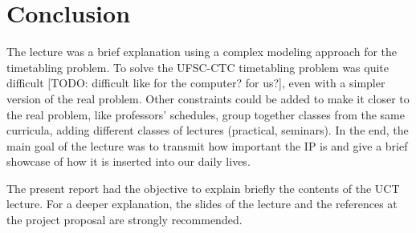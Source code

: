 \section{Conclusion}

The lecture was a brief explanation using a complex modeling approach for the timetabling problem. To solve the UFSC-CTC timetabling problem was quite difficult [TODO: difficult like for the computer? for us?], even with a simpler version of the real problem. Other constraints could be added to make it closer to the real problem, like professors' schedules, group together classes from the same curricula, adding different classes of lectures (practical, seminars). In the end, the main goal of the lecture was to transmit how important the IP is and give a brief showcase of how it is inserted into our daily lives.

The present report had the objective to explain briefly the contents of the UCT lecture. For a deeper explanation, the slides of the lecture and the references at the project proposal are strongly recommended.